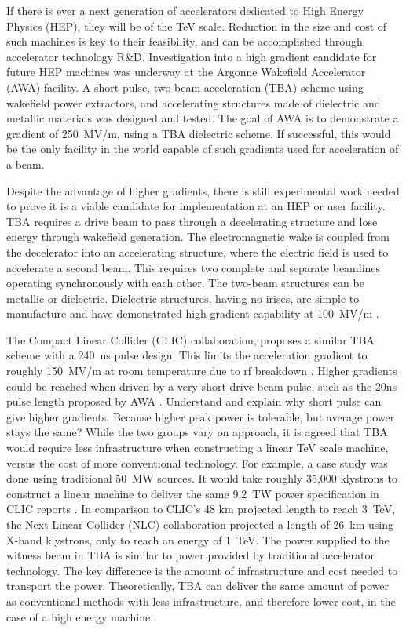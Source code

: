 \documentclass{iitthesis}
\newcommand{\nrnote}[1]{\textsf{{\color{blue}{ NN note:}   #1 }}}
\begin{document}
If there is ever a next generation of accelerators dedicated to High Energy Physics
(HEP), they will be of the TeV scale. Reduction in the size and cost
of such machines is key to their feasibility, and can be accomplished
through accelerator technology R\&D. Investigation into a 
high gradient candidate for future HEP machines was underway
at the Argonne Wakefield Accelerator (AWA) facility. A
short pulse, two-beam acceleration (TBA) scheme using 
wakefield power extractors, and accelerating structures made 
of dielectric and metallic materials was designed and tested. 
The goal of AWA is to demonstrate a gradient of
\SI{250}{MV/m}, using a TBA dielectric scheme. If successful, this would
be the only facility in the world capable of such gradients used for
acceleration of a beam.

Despite the advantage of higher gradients, there is still experimental work
needed to prove it is a viable candidate for implementation at an HEP or user facility.
TBA requires a drive beam to pass through a decelerating structure and
lose energy through wakefield generation. The electromagnetic wake
is coupled from the decelerator into an accelerating structure, where
the electric field is used to accelerate a second beam. This requires
two complete and separate beamlines operating synchronously with each other.  
The two-beam structures can be metallic or dielectric. Dielectric
structures, having no irises, are simple to manufacture and have demonstrated
high gradient capability at \SI{100}{MV/m} \cite{WeiPaper}. 

The Compact Linear Collider (CLIC) collaboration, proposes a similar TBA scheme with
a \SI{240}{ns} pulse design. This limits the acceleration gradient
to roughly \SI{150}{MV/m} at room temperature due to rf breakdown \cite{CLICdesignReport}.
Higher gradients could be reached when driven by a very short drive
beam pulse, such as the 20ns pulse length proposed by AWA \cite{WeiPaper}. 
\nrnote{Understand and explain why short pulse can give higher gradients. 
Because higher peak power is tolerable, but average power stays the same?}
While the two groups vary on approach, it is agreed that TBA would 
require less infrastructure when constructing a linear TeV scale machine, 
versus the cost of more conventional technology. 
For example, a case study was done using traditional \SI{50}{MW} sources.
It would take roughly 35,000 klystrons to construct a linear machine to deliver the same 
\SI{9.2}{TW} power specification in CLIC reports \cite{CLICdesignReport}. 
In comparison to CLIC's 48 km projected length to reach \SI{3}{TeV}, the Next Linear
Collider (NLC) collaboration projected a length of \SI{26}{km} using X-band klystrons,
only to reach an energy of \SI{1}{TeV}. %
The power supplied to the witness beam in TBA is similar to
power provided by traditional accelerator technology. 
The key difference is the amount of infrastructure and cost 
needed to transport the power. Theoretically, TBA can deliver
the same amount of power as conventional methods with less 
infrastructure, and therefore lower cost, in the case of a high energy machine. 
\end{document}
